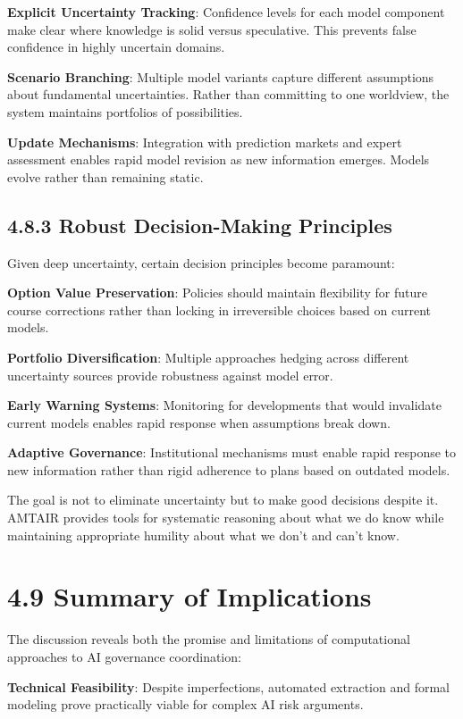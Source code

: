 \documentclass[
  11pt,
  letterpaper,
  openany]{book}
\begin{document}
\textbf{Explicit Uncertainty Tracking}: Confidence levels for each model
component make clear where knowledge is solid versus speculative. This
prevents false confidence in highly uncertain domains.

\textbf{Scenario Branching}: Multiple model variants capture different
assumptions about fundamental uncertainties. Rather than committing to
one worldview, the system maintains portfolios of possibilities.

\textbf{Update Mechanisms}: Integration with prediction markets and
expert assessment enables rapid model revision as new information
emerges. Models evolve rather than remaining static.

\subsection{4.8.3 Robust Decision-Making
Principles}\label{sec-robust-principles}

Given deep uncertainty, certain decision principles become paramount:

\textbf{Option Value Preservation}: Policies should maintain flexibility
for future course corrections rather than locking in irreversible
choices based on current models.

\textbf{Portfolio Diversification}: Multiple approaches hedging across
different uncertainty sources provide robustness against model error.

\textbf{Early Warning Systems}: Monitoring for developments that would
invalidate current models enables rapid response when assumptions break
down.

\textbf{Adaptive Governance}: Institutional mechanisms must enable rapid
response to new information rather than rigid adherence to plans based
on outdated models.

The goal is not to eliminate uncertainty but to make good decisions
despite it. AMTAIR provides tools for systematic reasoning about what we
do know while maintaining appropriate humility about what we don't and
can't know.

\section{4.9 Summary of Implications}\label{sec-implications-summary}

The discussion reveals both the promise and limitations of computational
approaches to AI governance coordination:

\textbf{Technical Feasibility}: Despite imperfections, automated
extraction and formal modeling prove practically viable for complex AI
risk arguments.
\end{document}
